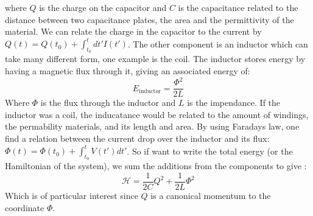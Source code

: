 where $Q$ is the charge on the capacitor and $C$ is the capacitance related to the distance between two capacitance plates, the area and the permittivity of the material. We can relate the charge in the capacitor to the current by $Q(t) = Q(t_0) + \int_{t_0}^{t} dt' I(t')$. The other component is an inductor which can take many different form, one example is the coil. The inductor stores energy by having a magnetic flux through it, giving an associated energy of:
\begin{equation}
    E_{\text{inductor}} = \frac{\Phi^2}{2 L}
\end{equation}
Where $\Phi$ is the flux through the inductor and $L$ is the impendance. If the inductor was a coil, the inducatance would be related to the amount of windings, the permability materials, and its length and area. By using Faradays law, one find a relation between the current drop over the inductor and its flux: $\Phi(t) = \Phi(t_0) + \int_{t_0}^t V(t')dt'$. So if want to write the total energy (or the Hamiltonian of the system), we sum the additions from the components to give \cite{blais_circuit_2021}:
\begin{equation}
    \mathcal{H} = \frac{1}{2C} Q^2 + \frac{1}{2L} \Phi^2
\end{equation}
Which is of particular interest since $Q$ is a canonical momentum to the coordinate $\Phi$. 




